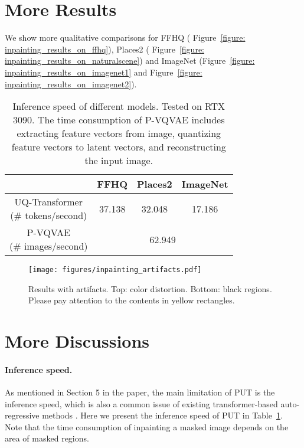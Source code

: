 \documentclass[10pt,twocolumn,letterpaper]{article}
\newcommand{\Tref}[1]{Table~\ref{#1}}
\newcommand{\Fref}[1]{Figure~\ref{#1}}
\begin{document}
\section{More Results}
\label{sec: more_results}
\label{sec: image_inainting_results}
We show more qualitative comparisons for FFHQ \cite{karras2019style} ( \Fref{figure: inpainting_results_on_ffhq}), Places2 \cite{zhou2017places} ( \Fref{figure: inpainting_results_on_naturalscene}) and ImageNet \cite{deng2009imagenet} (\Fref{figure: inpainting_results_on_imagenet1} and \Fref{figure: inpainting_results_on_imagenet2}). 



\begin{table}
	\setlength{\tabcolsep}{6pt}
\footnotesize
\centering
		\begin{tabular}{c|c|c|c}
			\hline
			\diagbox{Models}{Datasets} & FFHQ \cite{karras2019style} & Places2  \cite{zhou2017places} & ImageNet \cite{deng2009imagenet}  \\
			\hline 
			\makecell[c]{UQ-Transformer\\(\# tokens/second)} & 37.138 & 32.048 &17.186\\
			\hline
			\makecell[c]{P-VQVAE\\(\# images/second)}  &\multicolumn{3}{c}{62.949}  \\
			\hline
		\end{tabular}
	\caption{Inference speed of different models. Tested on RTX 3090. The time consumption of P-VQVAE includes extracting feature vectors from image, quantizing feature vectors to latent vectors, and reconstructing the input image.} 
	\label{tab: inference_speed}
\end{table}	


\begin{figure}[h]
	\centering
	\texttt{[image: figures/inpainting\_artifacts.pdf]} 
	\caption{Results with artifacts. Top: color distortion. Bottom: black regions. Please pay attention to the contents in yellow rectangles.}
	\label{figure: inpainting_artifacts}
\end{figure}




\section{More Discussions}
\label{sec: discussion}

\paragraph{Inference speed.} 
As mentioned in Section 5 in the paper, the main limitation of PUT is the inference speed, which is also a common issue of existing transformer-based auto-regressive methods \cite{vaswani2017attention, wan2021high, ramesh2021zero, esser2021taming}. Here we present the inference speed of PUT in \Tref{tab: inference_speed}. Note that the time consumption of inpainting a masked image depends on the area of masked regions.
\end{document}
